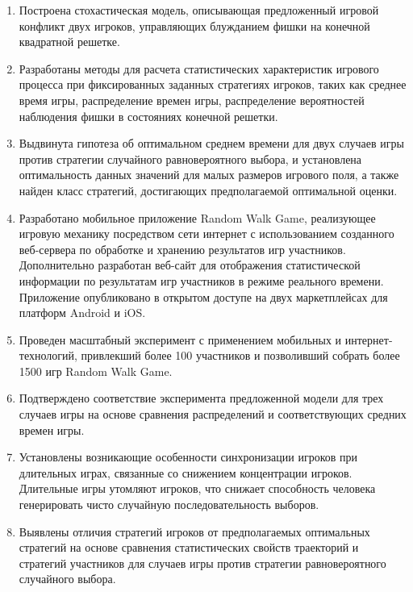 \begin{enumerate}
  \item Построена стохастическая модель, описывающая предложенный игровой конфликт двух игроков, управляющих блужданием фишки на конечной квадратной решетке. 
  \item Разработаны методы для расчета статистических характеристик игрового процесса при фиксированных заданных стратегиях игроков,
        таких как среднее время игры, распределение времен игры, распределение вероятностей наблюдения фишки в состояниях конечной решетки. 
  \item Выдвинута гипотеза об оптимальном среднем времени для двух случаев игры против стратегии случайного равновероятного выбора,
        и установлена оптимальность данных значений для малых размеров игрового поля, а также найден класс стратегий, достигающих предполагаемой оптимальной оценки.
  \item Разработано мобильное приложение Random Walk Game, реализующее игровую механику посредством сети интернет с использованием
        созданного веб-сервера по обработке и хранению результатов игр участников. Дополнительно разработан веб-сайт для
        отображения статистической информации по результатам игр участников в режиме реального времени.
        Приложение опубликовано в открытом доступе на двух маркетплейсах для платформ Android и iOS.
  \item Проведен масштабный эксперимент с применением мобильных и интернет-технологий, привлекший более 100 участников
        и позволивший собрать более 1500 игр Random Walk Game. 
  \item Подтверждено соответствие эксперимента предложенной модели для трех случаев игры на основе сравнения
        распределений и соответствующих средних времен игры. 
  \item Установлены возникающие особенности синхронизации игроков при длительных играх, связанные со снижением концентрации игроков.
        Длительные игры утомляют игроков, что снижает способность человека генерировать чисто случайную последовательность выборов.
  \item Выявлены отличия стратегий игроков от предполагаемых оптимальных стратегий
        на основе сравнения статистических свойств траекторий и стратегий участников для случаев игры против стратегии равновероятного случайного выбора.
\end{enumerate}
